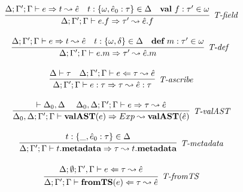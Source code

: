 \begin{figure}
\[\begin{array}{c}
\infer[\textit{T-field}]
	{\Delta; \Gamma'; \Gamma \vdash  e.f \Rightarrow \tau' \leadsto \hat{e}.f} 
	{\Delta; \Gamma'; \Gamma \vdash e \Rightarrow t \leadsto \hat{e} & t:\{\omega, \hat{e}_0:\tau\}\in \Delta & \keyw{val}\ f:\tau' \in \omega  }\\[3ex]

 
\infer[\textit{T-def }]
	{\Delta; \Gamma'; \Gamma \vdash  e.m \Rightarrow \tau' \leadsto \hat{e}.m} 
	{\Delta; \Gamma'; \Gamma \vdash e \Rightarrow t \leadsto \hat{e} & t: \{\omega, \delta\} \in \Delta & \keyw{def}\ m:\tau' \in \omega }\\[3ex]

\infer[\textit{T-ascribe}]
	{\Delta; \Gamma'; \Gamma  \vdash  e:\tau \Rightarrow \tau \leadsto \hat{e}:\tau}
	{\Delta \vdash \tau & \Delta; \Gamma'; \Gamma \vdash e \Leftarrow \tau \leadsto \hat{e} } \\[3ex]

\infer[\textit{T-valAST}]
        {\Delta_0, \Delta; \Gamma'; \Gamma \vdash \keyw{valAST}(e) \Rightarrow Exp \leadsto \keyw{valAST}(\hat{e}) }
	{\vdash \Delta_0, \Delta ~~~~ \Delta_0, \Delta; \Gamma'; \Gamma \vdash e \Rightarrow \tau \leadsto \hat{e}} \\[3ex]

\infer[\textit{T-metadata}]
        {\Delta; \Gamma'; \Gamma \vdash t.\keyw{metadata} \Rightarrow \tau \leadsto t.\keyw{metadata}  }
	{t:\{\_, \hat{e}_0:\tau\} \in \Delta} \\[3ex]

\infer[\textit{T-fromTS}]
	  {\Delta; \Gamma'; \Gamma \vdash \keyw{fromTS}(e) \Leftarrow \tau \leadsto \hat{e} }
	  {\renewcommand{\arraystretch}{1}
	    \begin{array}{r}
	    \Delta; \emptyset; \Gamma', \Gamma \vdash e \Leftarrow \tau \leadsto \hat{e}
            \end{array}
       } \\[3ex]  


\end{array}\]
\end{figure}

